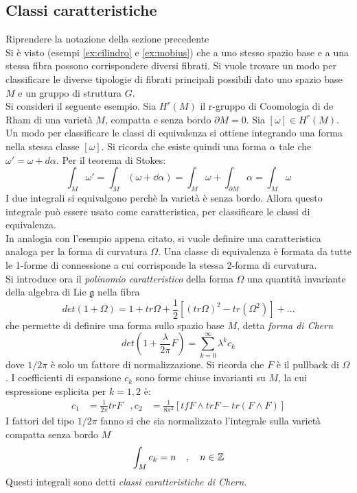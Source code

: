 \subsection{Classi caratteristiche}
Riprendere la notazione della sezione precedente \\

Si è visto (esempi \ref{ex:cilindro} e \ref{ex:mobius}) che a uno stesso spazio
base e a una stessa fibra possono corrispondere diversi fibrati. Si vuole trovare
un modo per classificare le diverse tipologie di fibrati principali possibili dato uno
spazio base $M$ e un gruppo di struttura $G$.\\

Si consideri il seguente esempio. Sia $H^r(M)$ il r-gruppo di Coomologia di de Rham
di una varietà $M$, compatta e senza bordo $\partial M = 0$.
Sia $[\omega] \in H^r(M)$.\\
Un modo per classificare le classi di equivalenza si ottiene integrando una forma
nella stessa classe $[\omega]$. Si ricorda che esiste quindi una forma $\alpha$
tale che $\omega' = \omega + d\alpha$. Per il teorema di Stokes:
$$ \int_M \omega' = \int_M (\omega + \dd \alpha) = \int_M \omega
   + \int_{\partial M} \alpha = \int_M \omega $$
I due integrali si equivalgono perchè la varietà è senza bordo. Allora questo integrale
può essere usato come caratteristica, per classificare le classi di equivalenza.\\

In analogia con l'esempio appena citato, si vuole definire una caratteristica
analoga per la forma di curvatura $\Omega$. Una classe di equivalenza è formata
da tutte le 1-forme di connessione a cui corrisponde la stessa 2-forma di curvatura.\\
Si introduce ora il \emph{polinomio caratteristico} della forma $\Omega$ una quantità
invariante della algebra di Lie $\mathfrak{g}$ nella fibra
$$ det(1+\Omega) = 1 + tr\Omega + \frac{1}{2}[(tr\Omega)^2 - tr(\Omega^2)] + \dots $$
che permette di definire una forma sullo spazio base $M$, detta \emph{forma di Chern}
$$ det\left(1 + \frac{\lambda}{2\pi}F\right) = \sum_{k=0}^\infty \lambda^k c_k $$
dove $1/2\pi$ è solo un fattore di normalizzazione. Si ricorda che $F$ è il pullback
di $\Omega$. I coefficienti di espansione $c_k$ sono forme chiuse invarianti su $M$,
la cui espressione esplicita per $k = 1,2$ è:
\begin{equation}
   \begin{aligned}
      c_1 &= \frac{1}{2\pi} trF &,
      c_2 & = \frac{1}{8\pi^2}[ tfF \wedge trF - tr(F \wedge F)]
   \end{aligned}
\end{equation}
I fattori del tipo $1/2\pi$ fanno si che sia normalizzato l'integrale sulla varietà
compatta senza bordo $M$
\begin{equation}
   \int_M c_k = n \quad , \quad n \in \mathbb{Z}
\end{equation}
Questi integrali sono detti \emph{classi caratteristiche di Chern}.\\

